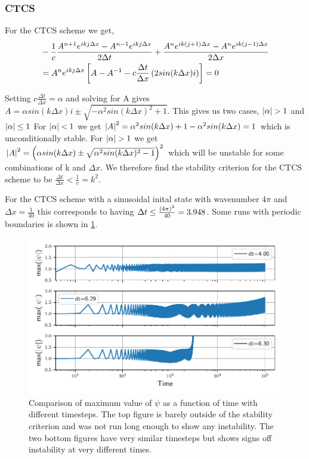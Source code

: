\subsubsection{CTCS}

For the CTCS scheme we get,
\begin{align}
  &-\frac{1}{c}\frac{A^{n+1} e^{ikj\Delta x} - A^{n-1} e^{ikj \Delta x}}{2 \Delta t} + \frac{A^n e^{ik(j+1) \Delta x} - A^{n} e^{ik(j-1)\Delta x}}{2 \Delta x} \\
  &= A^n e^{ikj\Delta x} \left[ A - A^{-1} - c\frac{\Delta t}{\Delta x} \left(2 sin(k\Delta x) i\right)\right] = 0
\end{align}

Setting $c\frac{\Delta t}{\Delta x} = \alpha$ and solving for A gives
$ A = \alpha sin(k\Delta x) i \pm \sqrt{-\alpha^2 sin(k\Delta x)^2 + 1}$.
This gives us two cases, $\abs{\alpha} > 1$ and $\abs{\alpha} \leq 1$
For $\abs{\alpha} < 1$ we get
$\abs{A}^2 = \alpha^2 sin(k\Delta x) + 1 - \alpha^2 sin(k\Delta x) = 1$
which is unconditionally stable.
For $\abs{\alpha} > 1$ we get $\abs{A}^2 = \left( \alpha sin(k\Delta x) \pm
\sqrt{\alpha^2 sin(k\Delta x)^2 -1 }\right)^2$ which will be unstable for some
combinations of k and $\Delta x$.
We therefore find the stability criterion for the CTCS scheme to be
$ \frac{\Delta t}{\Delta x} < \frac{1}{c} = k^2$.

For the CTCS scheme with a sinusoidal inital state with wavenumber $4 \pi$ and
$\Delta x = \frac{1}{40}$
this corresponds to having $ \Delta t \leq \frac{\left(4 \pi\right)^2}{40} = 3.948$.
Some runs with periodic boundaries is shown in \cref{fig:compare_ctcs}.


\begin{figure}[h]
  \centering
  \includegraphics[width=\textwidth]{../figures/stability_ctcs.pdf}
  \caption{Comparison of maximum value of $\psi$ as a function of time with
  different timesteps.
  The top figure is barely outside of the stability criterion and was not run
  long enough to show any instability. The two bottom figures have very similar
  timesteps but shows signs off instability at very different times.}
  \label{fig:compare_ctcs}
\end{figure}
